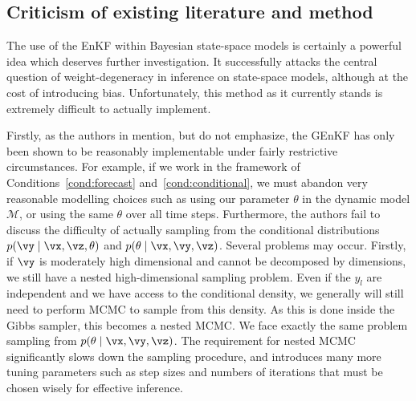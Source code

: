 \documentclass[12pt]{article}
\begin{document}
\subsection{Criticism of existing literature and method}\label{sec:criticism}
The use of the EnKF within Bayesian state-space models is certainly a
powerful idea which deserves further investigation. It successfully attacks
the central question of weight-degeneracy in inference on state-space models,
although at the cost of introducing bias. Unfortunately, this method as it
currently stands is extremely difficult to actually implement.

Firstly, as the authors in \cite{katzfuss2020} mention, but do not emphasize,
the GEnKF has only been shown to be reasonably implementable under fairly
restrictive circumstances. For example, if we work in the framework of
Conditions~\ref{cond:forecast} and~\ref{cond:conditional}, we must abandon
very reasonable modelling choices such as using our parameter $\theta$ in
the dynamic model $\mathcal M$, or using the same $\theta$ over all time steps.
Furthermore, the authors fail to discuss the difficulty of actually sampling
from the conditional distributions $p(\vy \mid \vx,\vz,\theta)$ and
$p(\theta \mid \vx,\vy,\vz)$. Several problems may occur. Firstly, if $\vy$ is
moderately high dimensional and cannot be decomposed by dimensions, we still
have a nested high-dimensional sampling problem. Even if the
$y_l$ are independent and we have access to the conditional density, we generally will still need to
perform MCMC to sample from this density. As this is done inside the Gibbs
sampler, this becomes a nested MCMC. We face exactly the same problem sampling
from $p(\theta \mid \vx,\vy,\vz)$. The requirement for nested MCMC significantly
slows down the sampling procedure, and introduces many more tuning
parameters such as step sizes and numbers of iterations that must be chosen
wisely for effective inference. 
\end{document}

